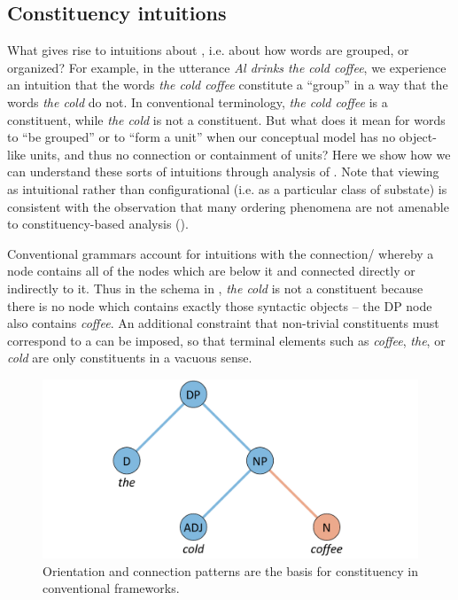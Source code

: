 \subsection{Constituency intuitions}

What gives rise to intuitions about , i.e. about how words are group\-ed, or organized? For example, in the utterance \textit{Al drinks the cold coffee}, we experience an intuition that the words \textit{the cold coffee} constitute a “group” in a way that the words \textit{the cold} do not. In conventional terminology, \textit{the cold coffee} is a constituent, while \textit{the cold} is not a constituent. But what does it mean for words to “be grouped” or to “form a unit” when our conceptual model has no object-like units, and thus no connection or containment of units? Here we show how we can understand these sorts of intuitions through analysis of . Note that viewing  as intuitional rather than configurational (i.e. as a particular class of substate) is consistent with the observation that many ordering phenomena are not amenable to constituency-based analysis (\citealt{Langacker1997,Phillips2003}).

  Conventional  grammars account for  intuitions with the connection/ whereby a node contains all of the nodes which are below it and connected directly or indirectly to it. Thus in the schema in {}, \textit{the cold} is not a constituent because there is no node which contains exactly those syntactic objects -- the DP node also contains \textit{coffee}. An additional constraint that non-trivial constituents must correspond to a  can be imposed, so that terminal elements such as \textit{coffee}, \textit{the}, or \textit{cold} are only constituents in a vacuous sense. 

  
\begin{figure}
\includegraphics[width=.75\textwidth]{figures/Tilsen-img136.png}
\caption{Orientation and connection patterns are the basis for constituency in conventional frameworks.}
\label{fig:6:17}
\end{figure}
 

